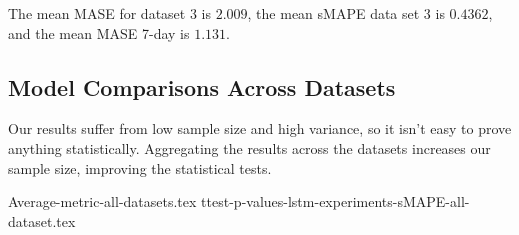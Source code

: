 The mean MASE for dataset 3 is $2.009$,
the mean sMAPE data set 3 is $0.4362$,
and the mean MASE 7-day is $1.131$.




\subsection{Model Comparisons Across Datasets}
Our results suffer from low sample size and high variance, so it isn't easy
to prove anything statistically. Aggregating the results across the datasets
increases our sample size, improving the statistical tests.

{Average-metric-all-datasets.tex}
{ttest-p-values-lstm-experiments-sMAPE-all-dataset.tex}
